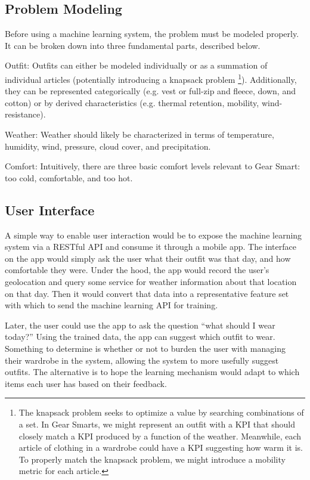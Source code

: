 \subsection{Problem Modeling}
Before using a machine learning system, the problem must be modeled properly. It can be broken down into three fundamental parts,
described below.

\begin{description}
  \item{Outfit:} Outfits can either be modeled individually or as a summation of individual articles (potentially introducing
  a knapsack problem \footnote{The knapsack problem seeks to optimize a value by searching combinations of a set. In Gear Smarts,
  we might represent an outfit with a KPI that should closely match a KPI produced by a function of the weather. Meanwhile, each
  article of clothing in a wardrobe could have a KPI suggesting how warm it is. To properly match the knapsack problem, we might
  introduce a mobility metric for each article.}). Additionally, they can be represented categorically (e.g. vest or full-zip and
  fleece, down, and cotton) or by derived characteristics (e.g. thermal retention, mobility, wind-resistance).
  \item{Weather:} Weather should likely be characterized in terms of temperature, humidity, wind, pressure,
  cloud cover, and precipitation.
  \item{Comfort:} Intuitively, there are three basic comfort levels relevant to Gear Smart: too cold, comfortable, and too hot.
\end{description}

\subsection{User Interface}
A simple way to enable user interaction would be to expose the machine learning system via a RESTful API and consume it
through a mobile app. The interface on the app would simply ask the user what their outfit was that day, and how comfortable
they were. Under the hood, the app would record the user's geolocation and query some service for weather information
about that location on that day. Then it would convert that data into a representative feature set with which to send
the machine learning API for training.

Later, the user could use the app to ask the question ``what should I wear today?'' Using the trained data, the app can
suggest which outfit to wear. Something to determine is whether or not to burden the user with managing
their wardrobe in the system, allowing the system to more usefully suggest outfits. The alternative is to hope the
learning mechanism would adapt to which items each user has based on their feedback.
